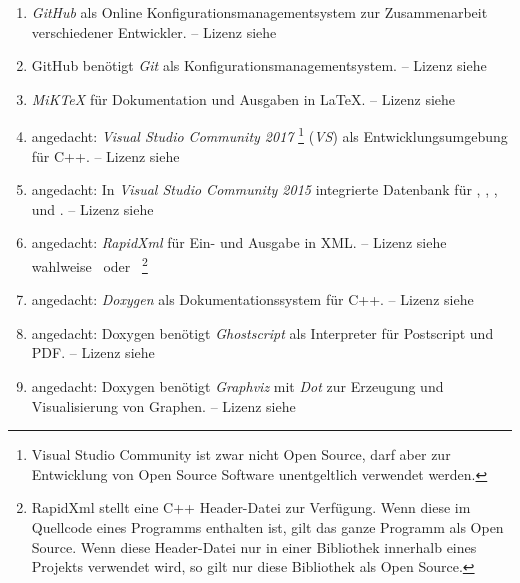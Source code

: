 \begin{enumerate}
	\setcounter{enumi}{\value{Enumi}}%

	\item\label{Werkzeug:GitHub}\emph{GitHub}
	als Online Konfigurationsmanagementsystem
	zur Zusammenarbeit verschiedener Entwickler.
	-- Lizenz siehe~\cite{bib:GPLii}

	\item\label{Werkzeug:Git}GitHub benötigt
	\emph{Git} als Konfigurationsmanagementsystem.
	-- Lizenz siehe~\cite{bib:GPLii}

	\item\label{Werkzeug:MiKTeX}\emph{MiK\TeX}
	für Dokumentation und Ausgaben in \LaTeX.
	-- Lizenz siehe~\cite{bib:MiKTeX}

	\item\label{Werkzeug:VSC}angedacht: \emph{Visual Studio Community 2017}%
	\footnote{%
		Visual Studio Community ist zwar nicht Open Source,
		darf aber zur Entwicklung von Open Source Software
		unentgeltlich verwendet werden.%
	}
	(\emph{VS}) als Entwicklungsumgebung für C++.
	-- Lizenz siehe~\cite{bib:EULA}

	\item\label{Werkzeug:VSC DB}angedacht: In \emph{Visual Studio Community 2015}
	integrierte Datenbank für , , ,
	 und .
	-- Lizenz siehe~\cite{bib:EULA}

	\item\label{Werkzeug:RapidXml}angedacht: \emph{RapidXml}
	für Ein- und Ausgabe in XML.
	-- Lizenz siehe wahlweise~\cite{bib:BSLi} oder~\cite{bib:MIT}
	\footnote{%
		RapidXml stellt eine C++ Header-Datei zur Verfügung.
		Wenn diese im Quellcode eines Programms enthalten ist,
		gilt das ganze Programm als Open Source.
		Wenn diese Header-Datei nur
		in einer Bibliothek innerhalb eines Projekts verwendet wird,
		so gilt nur diese Bibliothek als Open Source.%
	}

	\item\label{Werkzeug:Doxygen}angedacht: \emph{Doxygen}
	als Dokumentationssystem für C++.
	-- Lizenz siehe~\cite{bib:GPLii}

	\item\label{Werkzeug:Ghostscript}angedacht: Doxygen benötigt \emph{Ghostscript}
	als Interpreter für Postscript und PDF.
	-- Lizenz siehe~\cite{bib:AGPL}

	\item\label{Werkzeug:Graphviz}angedacht: Doxygen
	benötigt \emph{Graphviz} mit \emph{Dot}
	zur Erzeugung und Visualisierung von Graphen.
	-- Lizenz siehe~\cite{bib:EPL}

	\setcounter{Enumi}{\value{enumi}}%
\end{enumerate}

